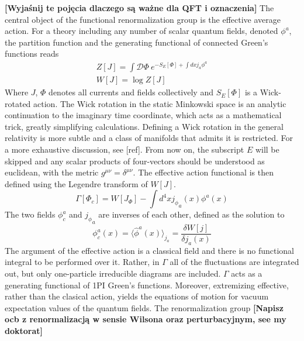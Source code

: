 \documentclass[11pt, a4paper]{article}
\newcommand{\jhk}[1]{{\color{red}#1}}
\newcommand{\jhkbf}[1]{\textbf{\color{red} [#1]}}
\begin{document}
\jhkbf{Wyjaśnij te pojęcia dlaczego są ważne dla QFT i oznaczenia}
The central object of the functional renormalization group is the effective average action.
For a theory including any number of scalar quantum fields, denoted $\phi^a$, the partition function and the generating functional of connected Green's functions reads
\begin{gather}
    Z[J] = \int \mathcal{D}\Phi \ e^{-S_E[\Phi] + \int dx j_a \phi^a} \\
    W[J] = \log{Z[J]}
\end{gather}
Where $J$, $\Phi$ denotes all currents and fields collectively and $S_E[\Phi]$ is a Wick-rotated action.
The Wick rotation in the static Minkowski space is an analytic continuation to the imaginary time coordinate, which acts as a mathematical trick, greatly simplifying calculations. Defining a Wick rotation in the general relativity is more subtle and a class of manifolds that admits it is restricted. For a more exhaustive discussion, see [ref].
From now on, the subscript $E$ will be skipped and any scalar products of four-vectors should be understood as euclidean, with the metric $g^{\mu\nu} = \delta^{\mu\nu}$.
The effective action functional is then defined using the Legendre transform of $W[J]$.
\begin{equation}
    \Gamma[\Phi_c] = W[J_\Phi] - \int d^4 x {j_\phi}_a(x) \phi^a(x)
\end{equation}
The two fields $\phi^a_c$ and ${j_\phi}_a$ are inverses of each other, defined as the solution to
\begin{equation}
    \phi^a_c(x) = \langle \hat\phi^a (x) \rangle_{j_a} = \frac{\delta W[j]}{\delta j_a(x)}
\end{equation}
The argument of the effective action is a classical field and there is no functional integral to be performed over it.
Rather, in $\Gamma$ all of the fluctuations are integrated out, but only one-particle irreducible diagrams
are included. $\Gamma$ acts as a generating functional of 1PI Green's functions. Moreover, extremizing effective, rather than the clasical action, yields the equations of motion for vacuum expectation values of the quantum fields.
\jhk{The renormalization group}
\jhkbf{Napisz ocb z renormalizacją w sensie Wilsona oraz perturbacyjnym, see my doktorat}
\end{document}
